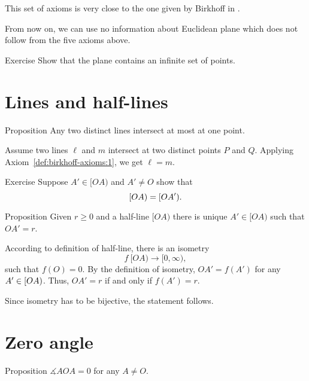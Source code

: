 \bigskip 


This set of axioms is very close to the one given by Birkhoff in \cite{birkhoff}.

From now on,  
we can use no information about Euclidean plane which does not follow from the five axioms above.

\begin{thm}{Exercise}\label{ex:infinite}
Show that the plane contains an infinite set of points.
\end{thm}


\section*{Lines and half-lines}

\begin{thm}{Proposition}\label{lem:line-line}
Any two distinct lines intersect at most at one point.
\end{thm}

Assume two lines $\ell$ and $m$ intersect at two distinct points $P$ and $Q$.
Applying Axiom~\ref{def:birkhoff-axioms:1}, we get $\ell=m$.
\qeds

\begin{thm}{Exercise}\label{ex:[OA)=[OA')}
Suppose $A'\in[OA)$ and $A'\not=O$ show that 
\[[O A)\z=[O A').\]

\end{thm}

\begin{thm}{Proposition}\label{prop:point-on-half-line}
Given $r\ge 0$ and a half-line $[O A)$ there is unique $A'\in [O A)$  such that $O A'=r$.
\end{thm}

According to definition of half-line, 
there is an isometry 
$$f\:[O A)\to [0,\infty),$$
such that $f(O)=0$.
By the definition of isometry, $O A'=f(A')$ for any $A'\z\in [O A)$.
Thus, $O A'=r$ if and only if $f(A')=r$.

Since isometry has to be bijective, the statement follows.
\qeds

\section*{Zero angle}

\begin{thm}{Proposition}\label{lem:AOA=0}
$\measuredangle A O A= 0$ for any $A\not=O$.
\end{thm}

